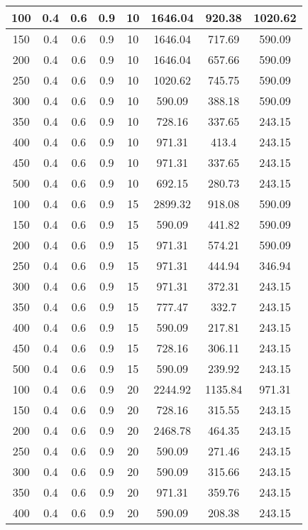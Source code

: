 \documentclass[a4paper, 12pt]{extreport}
\begin{document}
\begin{itemize}
\begin{longtable}{|c|c|c|c|c|c|c|c|}
			100 & 0.4 & 0.6 & 0.9 & 10 & 1646.04 & 920.38 & 1020.62 \\\hline
			150 & 0.4 & 0.6 & 0.9 & 10 & 1646.04 & 717.69 & 590.09 \\\hline
			200 & 0.4 & 0.6 & 0.9 & 10 & 1646.04 & 657.66 & 590.09 \\\hline
			250 & 0.4 & 0.6 & 0.9 & 10 & 1020.62 & 745.75 & 590.09 \\\hline
			300 & 0.4 & 0.6 & 0.9 & 10 & 590.09 & 388.18 & 590.09 \\\hline
			350 & 0.4 & 0.6 & 0.9 & 10 & 728.16 & 337.65 & 243.15 \\\hline
			400 & 0.4 & 0.6 & 0.9 & 10 & 971.31 & 413.4 & 243.15 \\\hline
			450 & 0.4 & 0.6 & 0.9 & 10 & 971.31 & 337.65 & 243.15 \\\hline
			500 & 0.4 & 0.6 & 0.9 & 10 & 692.15 & 280.73 & 243.15 \\\hline
			100 & 0.4 & 0.6 & 0.9 & 15 & 2899.32 & 918.08 & 590.09 \\\hline
			150 & 0.4 & 0.6 & 0.9 & 15 & 590.09 & 441.82 & 590.09 \\\hline
			200 & 0.4 & 0.6 & 0.9 & 15 & 971.31 & 574.21 & 590.09 \\\hline
			250 & 0.4 & 0.6 & 0.9 & 15 & 971.31 & 444.94 & 346.94 \\\hline
			300 & 0.4 & 0.6 & 0.9 & 15 & 971.31 & 372.31 & 243.15 \\\hline
			350 & 0.4 & 0.6 & 0.9 & 15 & 777.47 & 332.7 & 243.15 \\\hline
			400 & 0.4 & 0.6 & 0.9 & 15 & 590.09 & 217.81 & 243.15 \\\hline
			450 & 0.4 & 0.6 & 0.9 & 15 & 728.16 & 306.11 & 243.15 \\\hline
			500 & 0.4 & 0.6 & 0.9 & 15 & 590.09 & 239.92 & 243.15 \\\hline
			100 & 0.4 & 0.6 & 0.9 & 20 & 2244.92 & 1135.84 & 971.31 \\\hline
			150 & 0.4 & 0.6 & 0.9 & 20 & 728.16 & 315.55 & 243.15 \\\hline
			200 & 0.4 & 0.6 & 0.9 & 20 & 2468.78 & 464.35 & 243.15 \\\hline
			250 & 0.4 & 0.6 & 0.9 & 20 & 590.09 & 271.46 & 243.15 \\\hline
			300 & 0.4 & 0.6 & 0.9 & 20 & 590.09 & 315.66 & 243.15 \\\hline
			350 & 0.4 & 0.6 & 0.9 & 20 & 971.31 & 359.76 & 243.15 \\\hline
			400 & 0.4 & 0.6 & 0.9 & 20 & 590.09 & 208.38 & 243.15 \\\hline

\end{longtable}
\end{itemize}
\end{document}
